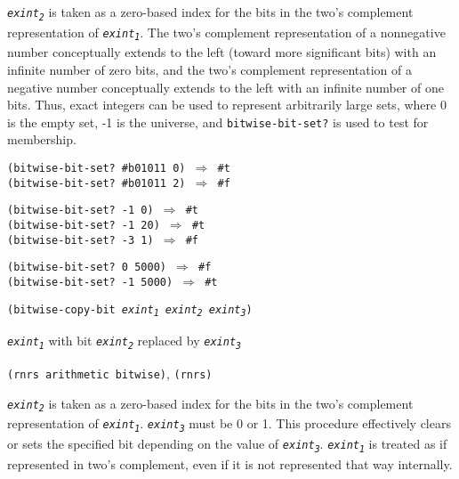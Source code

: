 \texttt{\textit{exint\textsubscript{2}}} is taken as a zero-based index for the bits
in the two's complement representation of \texttt{\textit{exint\textsubscript{1}}}.
The two's complement representation of a nonnegative number conceptually extends
to the left (toward more significant bits) with an infinite number of zero bits, and
the two's complement representation of a negative number conceptually extends
to the left with an infinite number of one bits.
Thus, exact integers can be used to represent arbitrarily large sets, where 0 is the
empty set, -1 is the universe, and \texttt{bitwise-bit-set?} is used to test for
membership.

\begin{alltt}
(bitwise-bit-set? \#{}b01011 0) \(\Rightarrow\) \#{}t
(bitwise-bit-set? \#{}b01011 2) \(\Rightarrow\) \#{}f

(bitwise-bit-set? -1 0) \(\Rightarrow\) \#{}t
(bitwise-bit-set? -1 20) \(\Rightarrow\) \#{}t
(bitwise-bit-set? -3 1) \(\Rightarrow\) \#{}f

(bitwise-bit-set? 0 5000) \(\Rightarrow\) \#{}f
(bitwise-bit-set? -1 5000) \(\Rightarrow\) \#{}t
\end{alltt}

\begin{description}

\label{objects_s140}\item[procedure] \texttt{(bitwise-copy-bit \textit{exint\textsubscript{1}} \textit{exint\textsubscript{2}} \textit{exint\textsubscript{3}})}



\item[returns] \texttt{\textit{exint\textsubscript{1}}} with bit \texttt{\textit{exint\textsubscript{2}}} replaced by \texttt{\textit{exint\textsubscript{3}}}


\item[libraries] \texttt{(rnrs arithmetic bitwise)}, \texttt{(rnrs)}
\end{description}

\texttt{\textit{exint\textsubscript{2}}} is taken as a zero-based index for the bits
in the two's complement representation of \texttt{\textit{exint\textsubscript{1}}}.
\texttt{\textit{exint\textsubscript{3}}} must be 0 or 1.
This procedure effectively clears or sets the specified bit depending
on the value of \texttt{\textit{exint\textsubscript{3}}}.
\texttt{\textit{exint\textsubscript{1}}} is treated as if represented in two's complement, even
if it is not represented that way internally.

